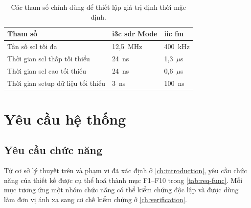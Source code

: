 \begin{table}[!htbp]
	\centering
	\caption{Các tham số chính dùng để thiết lập giá trị định thời mặc định.}
	\label{tab:timing}
	\begin{tabular}{L{5.5cm} C{3.8cm} C{3.8cm}}
		\toprule
		\textbf{Tham số}                   & \textbf{\gls{i3c} \gls{sdr} Mode} & \textbf{\gls{iic} \gls{fm}} \\
		\midrule
		Tần số \gls{scl} tối đa            & 12,5~MHz                          & 400~kHz                     \\
		Thời gian \gls{scl} thấp tối thiểu & 24~ns                             & 1,3~$\mu$s                  \\
		Thời gian \gls{scl} cao tối thiểu  & 24~ns                             & 0,6~$\mu$s                  \\
		Thời gian setup dữ liệu tối thiểu  & 3~ns                              & 100~ns                      \\
		\bottomrule
	\end{tabular}
\end{table}

\section{Yêu cầu hệ thống}
\label{sec:req}

\subsection{Yêu cầu chức năng}
\label{sec:req-func}

Từ cơ sở lý thuyết trên và phạm vi đã xác định ở \cref{ch:introduction}, yêu cầu chức năng của thiết kế được cụ thể hoá thành \FunctionalRequirementCount{} mục F1--F10 trong \cref{tab:req-func}. Mỗi mục tương ứng một nhóm chức năng có thể kiểm chứng độc lập và được dùng làm đơn vị ánh xạ sang cơ chế kiểm chứng ở \cref{ch:verification}.

